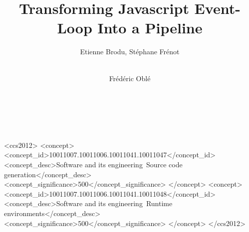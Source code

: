 \documentclass{sig-alternate}
\begin{document}
\title{
  Transforming Javascript Event-Loop Into a Pipeline
}

\author{
\alignauthor
Etienne Brodu, Stéphane Frénot\\
  \\
\and
\alignauthor
Frédéric Oblé\\
  \\
  \\
  \\
}

\begin{CCSXML}
<ccs2012>
<concept>
<concept_id>10011007.10011006.10011041.10011047</concept_id>
<concept_desc>Software and its engineering~Source code generation</concept_desc>
<concept_significance>500</concept_significance>
</concept>
<concept>
<concept_id>10011007.10011006.10011041.10011048</concept_id>
<concept_desc>Software and its engineering~Runtime environments</concept_desc>
<concept_significance>500</concept_significance>
</concept>
</ccs2012>
\end{CCSXML}



\maketitle



\printccsdesc
{}
\end{document}
